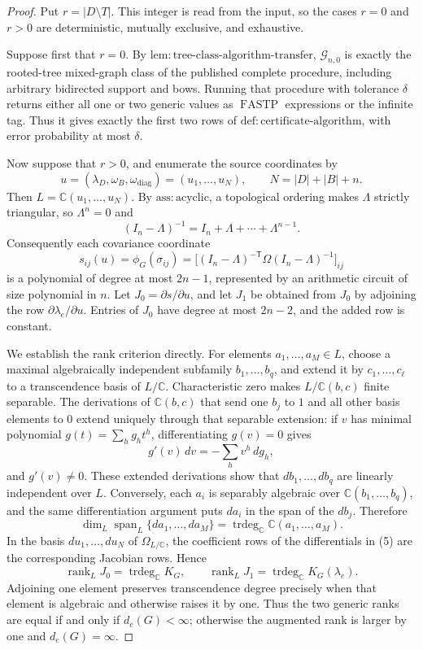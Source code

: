 \documentclass{article}
\begin{document}
\begin{proof}
Put \(r=|D\setminus T|\).  This integer is read from the input, so the cases \(r=0\) and \(r>0\) are deterministic, mutually exclusive, and exhaustive.

Suppose first that \(r=0\).  By \(\mathrm{lem:tree\mbox{-}class\mbox{-}algorithm\mbox{-}transfer}\), \(\mathcal G_{n,0}\) is exactly the rooted-tree mixed-graph class of the published complete procedure, including arbitrary bidirected support and bows.  Running that procedure with tolerance \(\delta\) returns either all one or two generic values as \(\operatorname{FASTP}\) expressions or the infinite tag.  Thus it gives exactly the first two rows of \(\mathrm{def:certificate\mbox{-}algorithm}\), with error probability at most \(\delta\).

Now suppose that \(r>0\), and enumerate the source coordinates by
\[
 u=(\lambda_D,\omega_B,\omega_{\mathrm{diag}})=(u_1,\ldots,u_N),
 \qquad N=|D|+|B|+n.
\tag{1}
\]
Then \(L=\mathbb C(u_1,\ldots,u_N)\).  By \(\mathrm{ass:acyclic}\), a topological ordering makes \(\Lambda\) strictly triangular, so \(\Lambda^n=0\) and
\[
 (I_n-\Lambda)^{-1}=I_n+\Lambda+\cdots+\Lambda^{n-1}.
\tag{2}
\]
Consequently each covariance coordinate
\[
 s_{ij}(u)=\phi_G(\sigma_{ij})
 =\bigl[(I_n-\Lambda)^{-\mathsf T}\Omega(I_n-\Lambda)^{-1}\bigr]_{ij}
\tag{3}
\]
is a polynomial of degree at most \(2n-1\), represented by an arithmetic circuit of size polynomial in \(n\).  Let \(J_0=\partial s/\partial u\), and let \(J_1\) be obtained from \(J_0\) by adjoining the row \(\partial\lambda_e/\partial u\).  Entries of \(J_0\) have degree at most \(2n-2\), and the added row is constant.

We establish the rank criterion directly.  For elements \(a_1,\ldots,a_M\in L\), choose a maximal algebraically independent subfamily \(b_1,\ldots,b_q\), and extend it by \(c_1,\ldots,c_\ell\) to a transcendence basis of \(L/\mathbb C\).  Characteristic zero makes \(L/\mathbb C(b,c)\) finite separable.  The derivations of \(\mathbb C(b,c)\) that send one \(b_j\) to \(1\) and all other basis elements to \(0\) extend uniquely through that separable extension: if \(v\) has minimal polynomial \(g(t)=\sum_h g_h t^h\), differentiating \(g(v)=0\) gives
\[
 g'(v)\,dv=-\sum_h v^h\,dg_h,
\tag{4}
\]
and \(g'(v)\ne0\).  These extended derivations show that \(db_1,\ldots,db_q\) are linearly independent over \(L\).  Conversely, each \(a_i\) is separably algebraic over \(\mathbb C(b_1,\ldots,b_q)\), and the same differentiation argument puts \(da_i\) in the span of the \(db_j\).  Therefore
\[
 \dim_L\operatorname{span}_L\{da_1,\ldots,da_M\}
 =\operatorname{trdeg}_{\mathbb C}\mathbb C(a_1,\ldots,a_M).
\tag{5}
\]
In the basis \(du_1,\ldots,du_N\) of \(\Omega_{L/\mathbb C}\), the coefficient rows of the differentials in (5) are the corresponding Jacobian rows.  Hence
\[
 \operatorname{rank}_L J_0=\operatorname{trdeg}_{\mathbb C}K_G,
 \qquad
 \operatorname{rank}_L J_1=\operatorname{trdeg}_{\mathbb C}K_G(\lambda_e).
\tag{6}
\]
Adjoining one element preserves transcendence degree precisely when that element is algebraic and otherwise raises it by one.  Thus the two generic ranks are equal if and only if \(d_e(G)<\infty\); otherwise the augmented rank is larger by one and \(d_e(G)=\infty\).


\end{proof}
\end{document}
